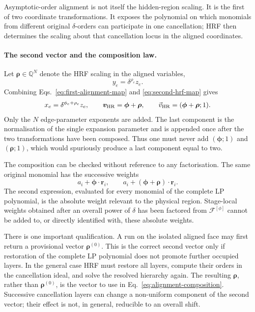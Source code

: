 \documentclass[a4paper,11pt]{article}
\newcommand{\HR}{\mathrm{HR}}
\newcommand{\vHR}{\vec v_{\rm HR}}
\begin{document}
Asymptotic-order alignment is not itself the hidden-region scaling.  It is
the first of two coordinate transformations.  It exposes the polynomial on
which monomials from different original \(\delta\)-orders can participate in
one cancellation; HRF then determines the scaling about that cancellation
locus in the aligned coordinates.

\paragraph{The second vector and the composition law.}

Let \(\boldsymbol\rho\in\mathbb Q^N\) denote the HRF scaling in the aligned
variables,
\begin{equation}
 y_e=\delta^{\rho_e}z_e.
 \label{eq:second-hrf-map}
\end{equation}
Combining Eqs.~\eqref{eq:first-alignment-map} and
\eqref{eq:second-hrf-map} gives
\begin{equation}
 x_e=\delta^{\phi_e+\rho_e}z_e,
 \qquad
 \boldsymbol v_{\HR}=\boldsymbol\phi+\boldsymbol\rho,
 \qquad
 \vHR=(\boldsymbol\phi+\boldsymbol\rho;1).
 \label{eq:alignment-composition}
\end{equation}
Only the \(N\) edge-parameter exponents are added.  The last component is the
normalisation of the single expansion parameter and is appended once after
the two transformations have been composed.  Thus one must never add
\((\boldsymbol\phi;1)\) and \((\boldsymbol\rho;1)\), which would spuriously
produce a last component equal to two.

The composition can be checked without reference to any factorisation.  The
same original monomial has the successive weights
\begin{equation}
 a_i+\boldsymbol\phi\cdot\boldsymbol r_i,
 \qquad
 a_i+(\boldsymbol\phi+\boldsymbol\rho)\cdot\boldsymbol r_i.
 \label{eq:successive-monomial-weights}
\end{equation}
The second expression, evaluated for every monomial of the complete LP
polynomial, is the absolute weight relevant to the physical region.
Stage-local weights obtained after an overall power of \(\delta\) has been
factored from \(\mathcal F^{[\phi]}\) cannot be added to, or directly
identified with, these absolute weights.

There is one important qualification.  A run on the isolated aligned face
may first return a provisional vector \(\boldsymbol\rho^{(0)}\).  This is the
correct second vector only if restoration of the complete LP polynomial does
not promote further occupied layers.  In the general case HRF must restore
all layers, compute their orders in the cancellation ideal, and solve the
resolved hierarchy again.  The resulting \(\boldsymbol\rho\), rather than
\(\boldsymbol\rho^{(0)}\), is the vector to use in
Eq.~\eqref{eq:alignment-composition}.  Successive cancellation layers can
change a non-uniform component of the second vector; their effect is not, in
general, reducible to an overall shift.
\end{document}
